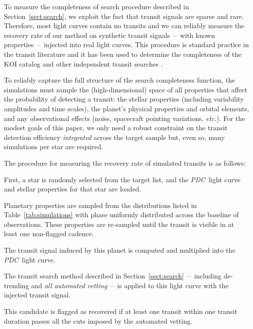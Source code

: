 \documentclass[manuscript, letterpaper]{aastex6}
\makeatletter
\let\origsection\section
\renewcommand\section{\@ifstar{\starsection}{\nostarsection}}
\newcommand\nostarsection[1]{\sectionprelude\origsection{#1}}
\newcommand\starsection[1]{\sectionprelude\origsection*{#1}}
\newcommand\sectionprelude{\vspace{1em}}
\newcommand{\project}[1]{\textsl{#1}}
\newcommand{\pdc}{\project{PDC}}
\newcommand{\foreign}[1]{\emph{#1}}
\newcommand{\etc}{\foreign{etc.}}
\newcommand{\sectionname}{Section}
\newcommand{\sectref}[1]{\ref{sect:#1}}
\newcommand{\Sect}[1]{\sectionname~\sectref{#1}}
\newcommand{\sect}[1]{\Sect{#1}}
\newcommand{\sectlabel}[1]{\label{sect:#1}}
\makeatother
\begin{document}
\section{Empirical search completeness}\sectlabel{completeness}

To measure the completeness of search procedure described in \sect{search}, we
exploit the fact that transit signals are sparse and rare.
Therefore, most light curves contain no transits and we can reliably measure
the recovery rate of our method on synthetic transit signals~--~with known
properties~--~injected into real light curves.
This procedure is standard practice in the transit literature and it has been
used to determine the completeness of the KOI catalog
\citep{Christiansen:2013, Christiansen:2015} and other independent transit
searches \citep{Petigura:2013, Dressing:2015, Foreman-Mackey:2015}.

To reliably capture the full structure of the search completeness function,
the simulations must sample the (high-dimensional) space of all properties
that affect the probability of detecting a transit: the stellar properties
(including variability amplitudes and time scales), the planet's physical
properties and orbital elements, and any observational effects (noise,
spacecraft pointing variations, \etc).
For the modest goals of this paper, we only need a robust constraint on the
transit detection efficiency \emph{integrated} across the target sample but,
even so, many simulations per star are required.

The procedure for measuring the recovery rate of simulated transits is as
follows:
\begin{enumerate}
{\item First, a star is randomly selected from the target list, and the \pdc\
light curve and stellar properties for that star are loaded.}
{\item Planetary properties are sampled from the distributions listed in
Table~\ref{tab:simulations} with phase uniformly distributed across the
baseline of observations. These properties are re-sampled until the transit is
visible in at least one non-flagged cadence.}
{\item The transit signal induced by this planet is computed and multiplied
into the \pdc\ light curve.}
{\item The transit search method described in \sect{search}~--~including
de-trending and \emph{all automated vetting}~--~is applied to this light
curve with the injected transit signal.}
{\item This candidate is flagged as recovered if at least one transit within
one transit duration passes all the cuts imposed by the automated vetting.}
\end{enumerate}
\end{document}
